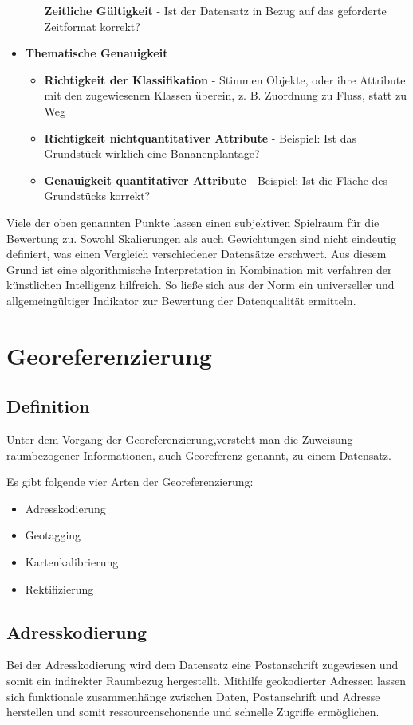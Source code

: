 \documentclass[11pt,fleqn]{book} %
\begin{document}
\begin{itemize}
\begin{itemize}
\textbf{Zeitliche Gültigkeit} - Ist der Datensatz in Bezug auf das geforderte Zeitformat korrekt?
\end{itemize}
\item \textbf{Thematische Genauigkeit}
\begin{itemize}
\item
\textbf{Richtigkeit der Klassifikation} - Stimmen Objekte, oder ihre Attribute mit den zugewiesenen Klassen überein, z. B. Zuordnung zu Fluss, statt zu Weg
\item \textbf{Richtigkeit nichtquantitativer Attribute} - Beispiel: Ist das Grundstück wirklich eine Bananenplantage?
\item \textbf{Genauigkeit quantitativer Attribute} - Beispiel: Ist die Fläche des Grundstücks korrekt?
\end{itemize}
\end{itemize}

Viele der oben genannten Punkte lassen einen subjektiven Spielraum für die Bewertung zu. Sowohl Skalierungen als auch Gewichtungen sind nicht eindeutig definiert, was einen Vergleich verschiedener Datensätze erschwert. Aus diesem Grund ist eine algorithmische Interpretation in Kombination mit verfahren der künstlichen Intelligenz hilfreich. So ließe sich aus der Norm ein universeller und allgemeingültiger Indikator zur Bewertung der Datenqualität ermitteln.


\section{Georeferenzierung}
\subsection{Definition}
Unter dem Vorgang der Georeferenzierung,versteht man die Zuweisung raumbezogener Informationen, auch Georeferenz genannt, zu einem Datensatz.

Es gibt folgende vier Arten der Georeferenzierung:

\begin{itemize}
\item Adresskodierung
\item Geotagging 
\item Kartenkalibrierung 
\item Rektifizierung
\end{itemize}

\subsection{Adresskodierung}
Bei der Adresskodierung wird dem Datensatz eine Postanschrift zugewiesen und somit ein indirekter Raumbezug hergestellt. Mithilfe geokodierter Adressen lassen sich funktionale zusammenhänge zwischen Daten, Postanschrift und Adresse herstellen und somit ressourcenschonende und schnelle Zugriffe ermöglichen.
\end{document}
